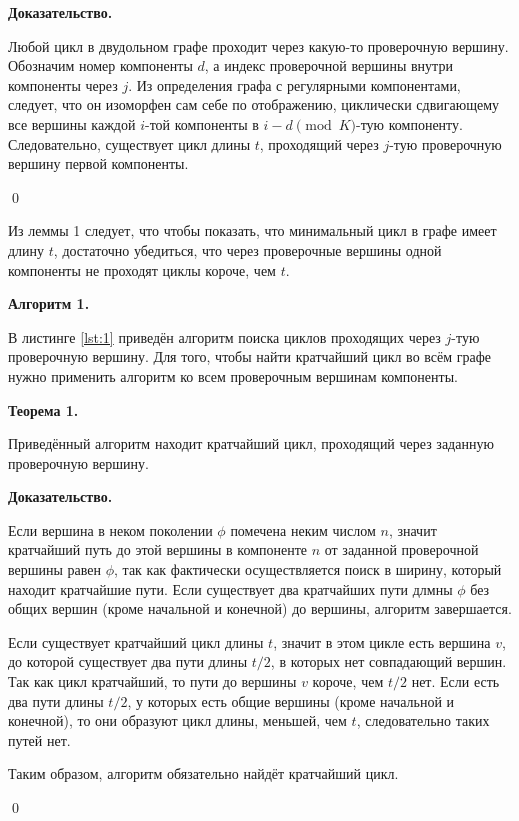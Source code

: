 \documentclass[14pt]{mmcs_article}
\begin{document}
\textbf{Доказательство.}

Любой цикл в двудольном графе проходит через какую-то проверочную вершину. Обозначим номер компоненты $d$, а индекс проверочной вершины внутри компоненты через $j$. Из определения графа с регулярными компонентами, следует, что он изоморфен сам себе по отображению, циклически сдвигающему все вершины каждой $i$-той компоненты в $i - d \pmod K$-тую компоненту. Следовательно, существует цикл длины $t$, проходящий через $j$-тую проверочную вершину первой компоненты.

\qed

Из леммы 1 следует, что чтобы показать, что минимальный цикл в графе имеет длину $t$, достаточно убедиться, что через проверочные вершины одной компоненты не проходят циклы короче, чем $t$.

\textbf{Алгоритм 1.} 

В листинге \ref{lst:1} приведён алгоритм поиска циклов проходящих через $j$-тую проверочную вершину. Для того, чтобы найти кратчайший цикл во всём графе нужно применить алгоритм ко всем проверочным вершинам компоненты.

\textbf{Теорема 1.}

Приведённый алгоритм находит кратчайший цикл, проходящий через заданную проверочную вершину.

\textbf{Доказательство.}

Если вершина в неком поколении $\phi$ помечена неким числом $n$, значит кратчайший путь до этой вершины в компоненте $n$ от заданной проверочной вершины равен $\phi$, так как фактически осуществляется поиск в ширину, который находит кратчайшие пути. Если существует два кратчайших пути длмны $\phi$ без общих вершин (кроме начальной и конечной) до вершины, алгоритм завершается.

Если существует кратчайший цикл длины $t$, значит в этом цикле есть вершина $v$, до которой существует два пути длины $t / 2$, в которых нет совпадающий вершин. Так как цикл кратчайший, то пути до вершины $v$ короче, чем $t / 2$ нет. Если есть два пути длины $t / 2$, у которых есть общие вершины (кроме начальной и конечной), то они образуют цикл длины, меньшей, чем $t$, следовательно таких путей нет.

Таким образом, алгоритм обязательно найдёт кратчайший цикл.

\qed
\end{document}
